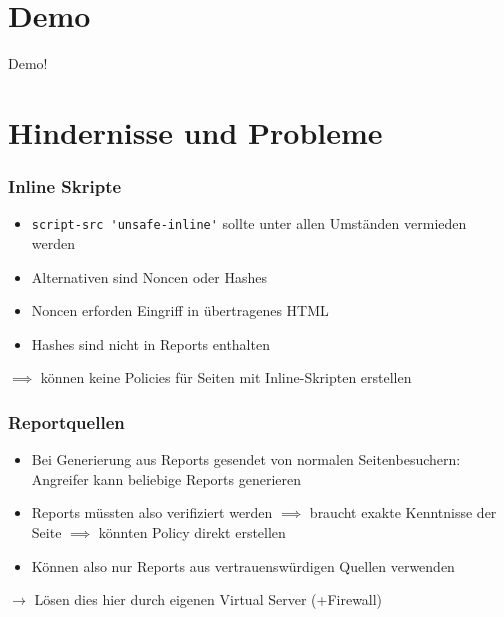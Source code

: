 \documentclass[handout]{beamer}
\begin{document}
\section{Demo}
\begin{frame}
Demo!
\end{frame}


\section{Hindernisse und Probleme}


\begin{frame}[c]
\frametitle{Inline Skripte}
\begin{itemize}
\item \colorbox{verylightgray}{\lstinline[basicstyle=\ttfamily\color{black}]|script-src 'unsafe-inline'|} sollte unter allen Umst\"anden vermieden werden
\item Alternativen sind Noncen oder Hashes
\item Noncen erforden Eingriff in \"ubertragenes HTML
\item Hashes sind nicht in Reports enthalten
\end{itemize}
$\implies$ k\"onnen keine Policies f\"ur Seiten mit Inline-Skripten erstellen\newline
\end{frame}

%

\begin{frame}
\frametitle{Reportquellen}
\begin{itemize}
\item Bei Generierung aus Reports gesendet von normalen Seitenbesuchern: Angreifer kann beliebige Reports generieren
\item Reports m\"ussten also verifiziert werden \newline$\implies$ braucht exakte Kenntnisse der Seite \newline$\implies$ k\"onnten Policy direkt erstellen
\item K\"onnen also nur Reports aus vertrauensw\"urdigen Quellen verwenden
\end{itemize}
$\rightarrow$ L\"osen dies hier durch eigenen Virtual Server (+Firewall)
\end{frame}
\end{document}
